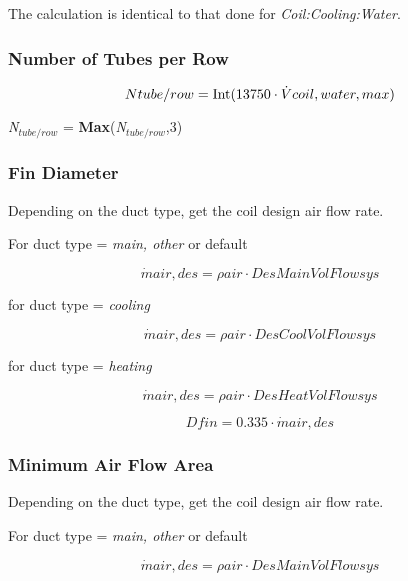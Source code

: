 The calculation is identical to that done for \emph{Coil:Cooling:Water}.

\subsubsection{Number of Tubes per Row}\label{number-of-tubes-per-row}

\begin{equation}
Ntube/row = {\mathop{\rm Int}\nolimits} ({\rm{13750}}\cdot \dot Vcoil,water,max)
\end{equation}

\emph{N\(_{tube/row}\)} = \textbf{Max}(\emph{N\(_{tube/row}\)},3)

\subsubsection{Fin Diameter}\label{fin-diameter}

Depending on the duct type, get the coil design air flow rate.

For duct type = \emph{main, other} or default

\begin{equation}
\dot mair,des = \rho air\cdot DesMainVolFlowsys
\end{equation}

for duct type = \emph{cooling}

\begin{equation}
\dot mair,des = \rho air\cdot DesCoolVolFlowsys
\end{equation}

for duct type = \emph{heating}

\begin{equation}
\dot mair,des = \rho air\cdot DesHeatVolFlowsys
\end{equation}

\begin{equation}
Dfin = 0.335\cdot \dot mair,des
\end{equation}

\subsubsection{Minimum Air Flow Area}\label{minimum-air-flow-area}

Depending on the duct type, get the coil design air flow rate.

For duct type = \emph{main, other} or default

\begin{equation}
\dot mair,des = \rho air\cdot DesMainVolFlowsys
\end{equation}

